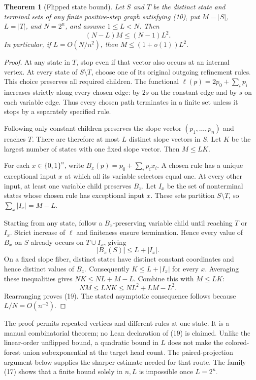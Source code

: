 \documentclass[11pt]{article}
\newtheorem{theorem}{Theorem}
\begin{document}
\begin{theorem}[Flipped state bound]
Let $S$ and $T$ be the distinct state and terminal sets of any finite
positive-step graph satisfying (10), put $M=|S|$, $L=|T|$, and
$N=2^n$, and assume $1\le L<N$. Then
\[
                        (N-L)M\le (N-1)L^2. \tag{19}
\]
In particular, if $L=O(N/n^2)$, then $M\le(1+o(1))L^2$.
\end{theorem}
\begin{proof}
At any state in $T$, stop even if that vector also occurs at an internal
vertex. At every state of $S\setminus T$, choose one of its original
outgoing refinement rules. This choice preserves all required children.
The functional $\ell(p)=2p_0+\sum_i p_i$ increases strictly along every
chosen edge: by $2s$ on the constant edge and by $s$ on each variable
edge. Thus every chosen path terminates in a finite set unless it stops
by a separately specified rule.

Following only constant children preserves the slope vector
$(p_1,\ldots,p_n)$ and reaches $T$. There are therefore at most $L$
distinct slope vectors in $S$. Let $K$ be the largest number of states
with one fixed slope vector. Then $M\le LK$.

For each $x\in\{0,1\}^n$, write $B_x(p)=p_0+\sum_i p_ix_i$.
A chosen rule has a unique exceptional input $x$ at which all its
variable selectors equal one. At every other input, at least one
variable child preserves $B_x$. Let $I_x$ be the set of nonterminal
states whose chosen rule has exceptional input $x$. These sets partition
$S\setminus T$, so $\sum_x|I_x|=M-L$.

Starting from any state, follow a $B_x$-preserving variable child
until reaching $T$ or $I_x$. Strict increase of $\ell$ and finiteness
ensure termination. Hence every value of $B_x$ on $S$ already occurs
on $T\cup I_x$, giving
\[
                       |B_x(S)|\le L+|I_x|.
\]
On a fixed slope fiber, distinct states have distinct constant
coordinates and hence distinct values of $B_x$. Consequently
$K\le L+|I_x|$ for every $x$. Averaging these inequalities gives
$NK\le NL+M-L$. Combine this with $M\le LK$:
\[
                   NM\le LNK\le NL^2+LM-L^2.
\]
Rearranging proves (19). The stated asymptotic consequence follows
because $L/N=O(n^{-2})$.
\end{proof}

The proof permits repeated vertices and different rules at one state.
It is a manual combinatorial theorem; no Lean declaration of (19)
is claimed. Unlike the linear-order unflipped bound, a quadratic bound
in $L$ does not make the colored-forest union subexponential at the
target head count. The paired-projection argument below supplies the sharper estimate
needed for that route. The family (17) shows that a finite bound solely
in $n,L$ is impossible once $L=2^n$.
\end{document}
